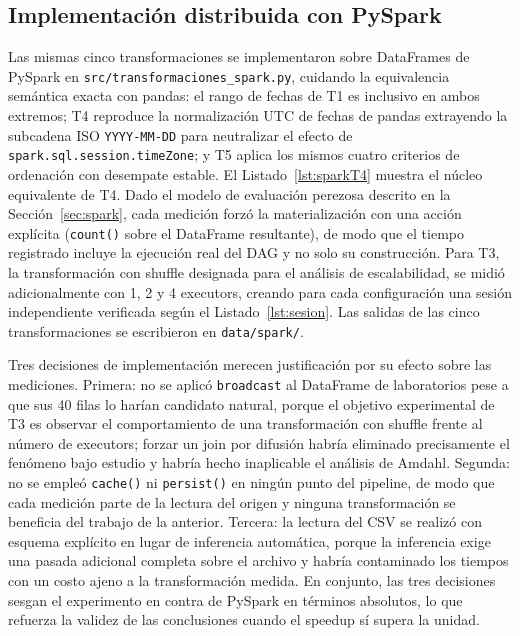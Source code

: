 \documentclass[10pt,journal]{IEEEtran}
\begin{document}
\subsection{Implementaci\'on distribuida con PySpark}
\label{sec:pyspark}
Las mismas cinco transformaciones se implementaron sobre DataFrames de PySpark
en \texttt{src/transformaciones\_spark.py}, cuidando la equivalencia sem\'antica
exacta con pandas: el rango de fechas de T1 es inclusivo en ambos extremos; T4
reproduce la normalizaci\'on UTC de fechas de pandas extrayendo la subcadena
ISO \texttt{YYYY-MM-DD} para neutralizar el efecto de
\texttt{spark.sql.session.timeZone}; y T5 aplica los mismos cuatro criterios de
ordenaci\'on con desempate estable. El Listado~\ref{lst:sparkT4} muestra el
n\'ucleo equivalente de T4. Dado el modelo de evaluaci\'on perezosa descrito en
la Secci\'on~\ref{sec:spark}, cada medici\'on forz\'o la materializaci\'on con
una acci\'on expl\'icita (\texttt{count()} sobre el DataFrame resultante), de
modo que el tiempo registrado incluye la ejecuci\'on real del DAG y no solo su
construcci\'on. Para T3, la transformaci\'on con shuffle designada para el
an\'alisis de escalabilidad, se midi\'o adicionalmente con 1, 2 y 4 executors,
creando para cada configuraci\'on una sesi\'on independiente verificada seg\'un
el Listado~\ref{lst:sesion}. Las salidas de las cinco transformaciones se
escribieron en \texttt{data/spark/}.

Tres decisiones de implementaci\'on merecen justificaci\'on por su efecto sobre
las mediciones. Primera: no se aplic\'o \texttt{broadcast} al DataFrame de
laboratorios pese a que sus 40 filas lo har\'ian candidato natural, porque el
objetivo experimental de T3 es observar el comportamiento de una
transformaci\'on con shuffle frente al n\'umero de executors; forzar un join
por difusi\'on habr\'ia eliminado precisamente el fen\'omeno bajo estudio y
habr\'ia hecho inaplicable el an\'alisis de Amdahl. Segunda: no se emple\'o
\texttt{cache()} ni \texttt{persist()} en ning\'un punto del pipeline, de modo
que cada medici\'on parte de la lectura del origen y ninguna transformaci\'on
se beneficia del trabajo de la anterior. Tercera: la lectura del CSV se
realiz\'o con esquema expl\'icito en lugar de inferencia autom\'atica, porque la
inferencia exige una pasada adicional completa sobre el archivo y habr\'ia
contaminado los tiempos con un costo ajeno a la transformaci\'on medida. En
conjunto, las tres decisiones sesgan el experimento en contra de PySpark en
t\'erminos absolutos, lo que refuerza la validez de las conclusiones cuando el
speedup s\'i supera la unidad.
\end{document}
